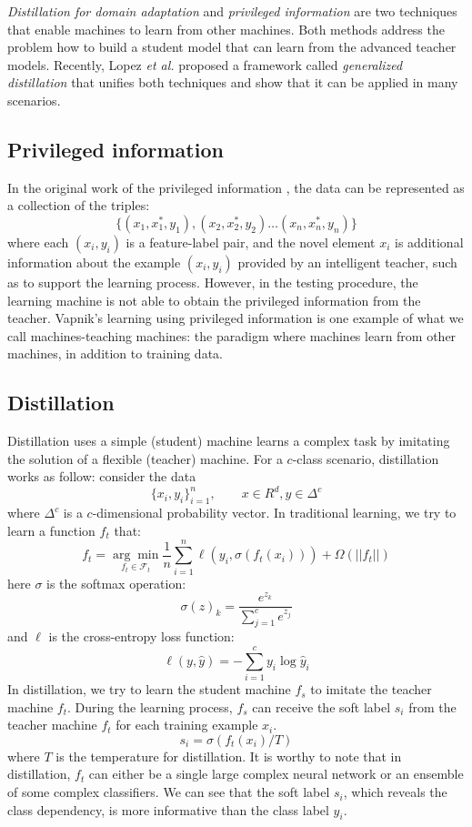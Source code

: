 \textit{Distillation for domain adaptation} \cite{hinton2015distilling} and \textit{privileged information} \cite{vapnik2015learning} are two techniques that enable machines to learn from other machines. Both methods address the problem how to build a student model that can learn from the advanced teacher models. Recently, Lopez \textit{et al.} \cite{lopez2015unifying} proposed a framework called \textit{generalized distillation} that unifies both techniques and show that it can be applied in many scenarios.
\subsection{Privileged information}
In the original work of the privileged information \cite{vapnik2015learning}, the data can be represented as a collection of the triples:
\[\{\left(x_1,x_1^*,y_1\right),\left(x_2,x_2^*,y_2\right) \dots \left(x_n,x_n^*,y_n\right)\}\]
where each $(x_i,y_i)$ is a feature-label pair, and the novel element $x_i$ is additional information about the example $(x_i,y_i)$ provided by an intelligent teacher, such as to support the learning process. However, in the testing procedure, the learning machine is not able to obtain the privileged information from the teacher. Vapnik's learning using privileged information is one example of what we call machines-teaching machines: the paradigm where machines learn from other machines, in addition to training data. 
\subsection{Distillation}
Distillation uses a simple (student) machine learns a complex task by imitating the solution of a flexible (teacher) machine. For a $c$-class scenario, distillation works as follow: consider the data
\[\{x_i,y_i\}_{i=1}^n, \qquad x\in R^d, y\in \Delta^c\]
where $\Delta^c$ is a $c$-dimensional probability vector. In traditional learning, we try to learn a function $f_t$ that:
\begin{equation}\label{eq:normal}
f_t=\underset{f_t \in \mathcal{F}_t}{\arg \min}\frac{1}{n}\sum_{i=1}^{n}\ell\left(y_i,\sigma(f_t(x_i))\right)+\Omega(||f_t||)
\end{equation}
here $\sigma$ is the softmax operation:
\[\sigma(z)_k=\frac{e^{z_k}}{\sum_{j=1}^{c}e^{z_j}}\]
and $\ell$ is the cross-entropy loss function:
\[\ell(y,\hat{y})=-\sum_{i=1}^{c}y_i\log\hat{y}_i\]
In distillation, we try to learn the student machine $f_s$ to imitate the teacher machine $f_t$. During the learning process, $f_s$ can receive the soft label $s_i$ from the teacher machine $f_t$ for each training example $x_i$.
\begin{equation}\label{eq:softmax_T}
s_i=\sigma(f_t(x_i)/T)
\end{equation}
where $T$ is the temperature for distillation. It is worthy to note that in distillation, $f_t$ can either be a single large complex neural network or an ensemble of some complex classifiers. We can see that the soft label $s_i$, which reveals the class dependency, is more informative than the class label $y_i$.

